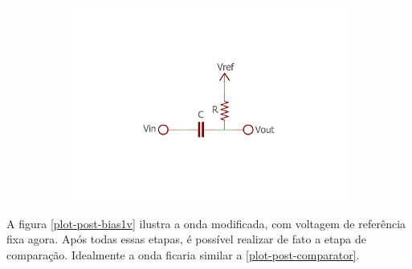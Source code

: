 	\begin{figure}[h]
		\caption{\label{plot-post-bias1v} Gráfico com adição de componente DC $V_{DC} = V_{ref}$ fixa e filtro passa-altas modificado. Agora não existe tensão }
		\begin{subfigure}{.5\textwidth}
			\centering
		\end{subfigure}
		\begin{subfigure}{.5\textwidth}
			\centering
			\includegraphics[width=1\textwidth, trim={3cm 0cm 3cm 3cm},clip]{circuits/highpass_filter_bias.pdf}
		\end{subfigure}
	\end{figure}

	 A figura \autoref{plot-post-bias1v} ilustra a onda modificada, com voltagem de referência fixa agora. Após todas essas etapas, é possível realizar de fato a etapa de comparação. Idealmente a onda ficaria similar a \autoref{plot-post-comparator}.
	
